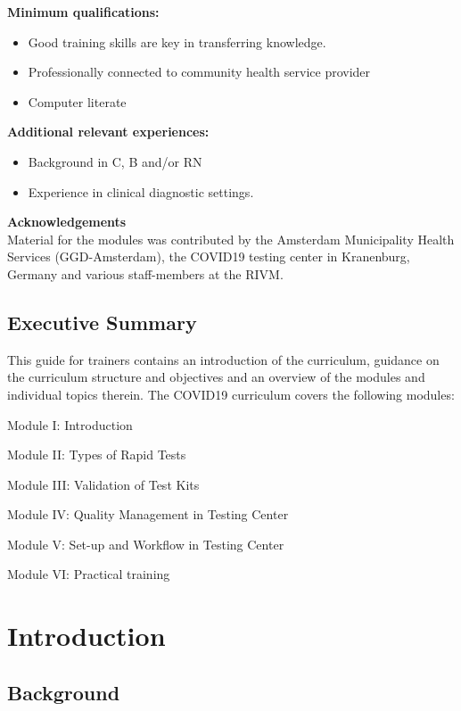\documentclass[
]{book}
\begin{document}
\textbf{Minimum qualifications:}

\begin{itemize}
\item
  Good training skills are key in transferring knowledge.
\item
  Professionally connected to community health service provider
\item
  Computer literate
\end{itemize}

\textbf{Additional relevant experiences:}

\begin{itemize}
\item
  Background in C, B and/or RN
\item
  Experience in clinical diagnostic settings.
\end{itemize}

\textbf{Acknowledgements\\
}Material for the modules was contributed by the Amsterdam Municipality
Health Services (GGD-Amsterdam), the COVID19 testing center in
Kranenburg, Germany and various staff-members at the RIVM.

\hypertarget{executive-summary}{%
\section{Executive Summary}\label{executive-summary}}

This guide for trainers contains an introduction of the curriculum,
guidance on the curriculum structure and objectives and an overview of
the modules and individual topics therein. The COVID19 curriculum covers
the following modules:

Module I: Introduction

Module II: Types of Rapid Tests

Module III: Validation of Test Kits

Module IV: Quality Management in Testing Center

Module V: Set-up and Workflow in Testing Center

Module VI: Practical training

\hypertarget{intro}{%
\chapter{Introduction}\label{intro}}

\hypertarget{background}{%
\section{Background}\label{background}}
\end{document}
